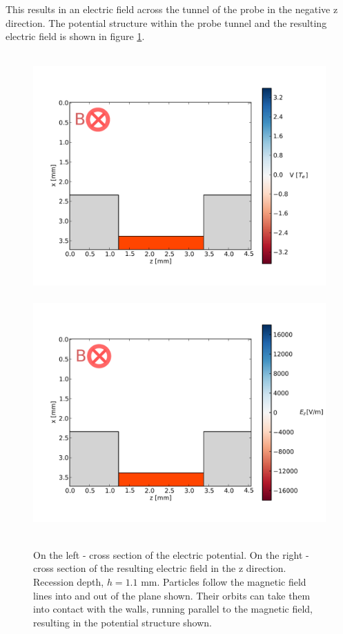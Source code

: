 This results in an electric field across the tunnel of the probe in the negative z direction. The potential structure within the probe tunnel and the resulting electric field is shown in figure \ref{fig:phi_plots}. 
\begin{figure}[H]
	\hbox{%
		\includegraphics[width=.5\textwidth]{figure2.pdf}%
	}%
	\hbox{%
		\includegraphics[width=.5\textwidth]{figure3.pdf}%
	}%
	
	\noindent
	\parbox{.5\textwidth}{%
		\centering
		
	}%
	\hfil
	\parbox{.5\textwidth}{%
		\centering
		
	}%
	
	\caption{On the left - cross section of the electric potential.  On the right - cross section of the resulting electric field in the z direction. Recession depth, $h = 1.1$ mm. Particles follow the magnetic field lines into and out of the plane shown. Their orbits can take them into contact with the walls, running parallel to the magnetic field, resulting in the potential structure shown.}
	\label{fig:phi_plots}
\end{figure}
